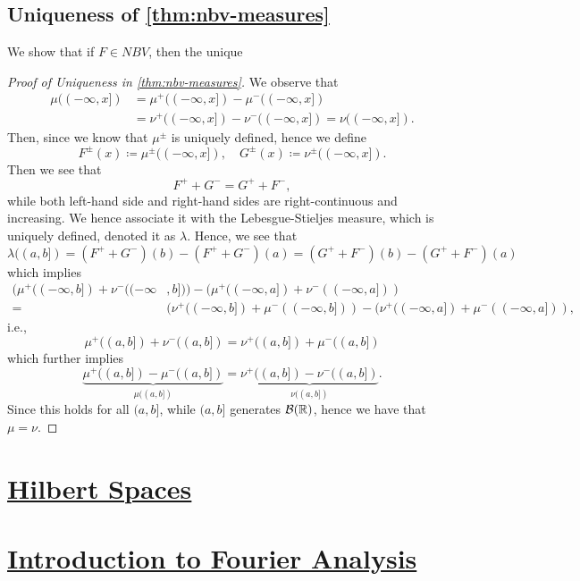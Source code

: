 \subsection{Uniqueness of \autoref{thm:nbv-measures}}\label{pf:thm:nbv-measures-uniqueness}
\begin{claim}
	We show that if \(F\in NBV\), then the unique
\end{claim}
\begin{proof}[Proof of Uniqueness in \autoref{thm:nbv-measures}]
	We observe that
	\[
		\begin{split}
			\mu ((-\infty , x]) &= \mu^+ ((-\infty , x]) - \mu ^- ((-\infty , x])\\
			&= \nu ^+((-\infty , x]) - \nu ^-((-\infty , x]) = \nu ((-\infty , x]).
		\end{split}
	\]
	Then, since we know that \(\mu ^\pm\) is uniquely defined, hence we define
	\[
		F^\pm (x) \coloneqq  \mu ^\pm ((-\infty , x]),\quad G^\pm (x) \coloneqq \nu ^\pm ((-\infty , x]).
	\]
	Then we see that
	\[
		F^+ + G^- = G^+ + F^-,
	\]
	while both left-hand side and right-hand sides are right-continuous and increasing. We hence associate it with the Lebesgue-Stieljes measure, which is
	uniquely defined, denoted it as \(\lambda \). Hence, we see that
	\[
		\lambda ((a, b]) = (F^+ + G^-)(b) - (F^+ + G^-)(a) = (G^+ + F^-)(b) - (G^+ + F^-)(a)
	\]
	which implies
	\[
		\begin{split}
			(\mu ^+((-\infty , b]) + \nu ^-((-\infty &, b])) - (\mu ^+((-\infty , a]) + \nu ^-((-\infty , a]))\\
			= &(\nu ^+((-\infty , b]) + \mu ^-((-\infty , b])) - (\nu ^+((-\infty , a]) + \mu ^-((-\infty , a])),
		\end{split}
	\]
	i.e.,
	\[
		\mu ^+((a, b]) + \nu ^-((a, b]) = \nu ^+((a, b]) + \mu ^-((a, b])
	\]
	which further implies
	\[
		\underbrace{\mu ^+((a, b]) - \mu ^-((a, b])}_{\mu ((a, b])} = \underbrace{\nu ^+((a, b]) - \nu ^-((a, b])}_{\nu ((a, b])}.
	\]
	Since this holds for all \((a, b]\), while \((a, b]\) generates \(\mathcal{\MakeUppercase{b}} (\mathbb{\MakeUppercase{r}} )\), hence
	we have that \(\mu = \nu \).
\end{proof}
\section{\hyperref[ch:Hilbert-Spaces]{Hilbert Spaces}}

\section{\hyperref[ch:Introduction-to-Fourier-Analysis]{Introduction to Fourier Analysis}}